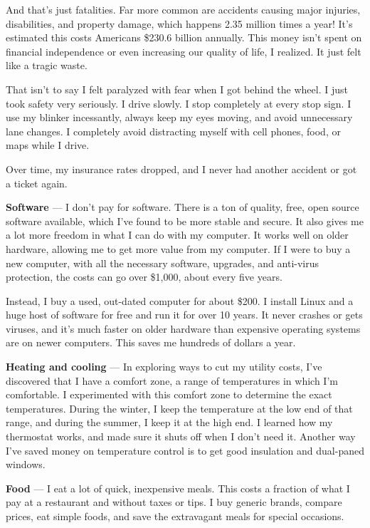 And that's just fatalities. Far more common are accidents causing major injuries, disabilities, and property damage, which happens 2.35 million times a year! It's estimated this costs Americans \$230.6 billion annually.\cite{asirt-crash-statistics} This money isn't spent on financial independence or even increasing our quality of life, I realized. It just felt like a tragic waste.

That isn't to say I felt paralyzed with fear when I got behind the wheel. I just took safety very seriously. I drive slowly. I stop completely at every stop sign. I use my blinker incessantly, always keep my eyes moving, and avoid unnecessary lane changes. I completely avoid distracting myself with cell phones, food, or maps while I drive.

Over time, my insurance rates dropped, and I never had another accident or got a ticket again.

\textbf{Software} --- I don't pay for software. There is a ton of quality, free, open source software available, which I've found to be more stable and secure. It also gives me a lot more freedom in what I can do with my computer. It works well on older hardware, allowing me to get more value from my computer. If I were to buy a new computer, with all the necessary software, upgrades, and anti-virus protection, the costs can go over \$1,000, about every five years.

Instead, I buy a used, out-dated computer for about \$200. I install Linux and a huge host of software for free and run it for over 10 years. It never crashes or gets viruses, and it's much faster on older hardware than expensive operating systems are on newer computers. This saves me hundreds of dollars a year.

\textbf{Heating and cooling} --- In exploring ways to cut my utility costs, I've discovered that I have a comfort zone, a range of temperatures in which I'm comfortable. I experimented with this comfort zone to determine the exact temperatures. During the winter, I keep the temperature at the low end of that range, and during the summer, I keep it at the high end. I learned how my thermostat works, and made sure it shuts off when I don't need it. Another way I've saved money on temperature control is to get good insulation and dual-paned windows.

\textbf{Food} --- I eat a lot of quick, inexpensive meals. This costs a fraction of what I pay at a restaurant and without taxes or tips. I buy generic brands, compare prices, eat simple foods, and save the extravagant meals for special occasions.

